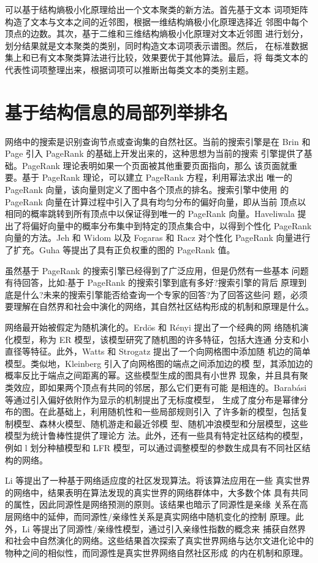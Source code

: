 \documentclass[a4paper]{apa6}
\begin{document}
可以基于结构熵极小化原理给出一个文本聚类的新方法。首先基于文本 词项矩阵构造了文本与文本之间的近邻图，根据一维结构熵极小化原理选择近 邻图中每个顶点的边数。其次，基于二维和三维结构熵极小化原理对文本近邻图 进行划分，划分结果就是文本聚类的类别，同时构造文本词项表示谱图。然后， 在标准数据集上和已有文本聚类算法进行比较，效果要优于其他算法。最后，将 每类文本的代表性词项整理出来，根据词项可以推断出每类文本的类别主题。

\section{基于结构信息的局部列举排名}
\label{sec:org2845766}
网络中的搜索是识别查询节点或查询集的自然社区。当前的搜索引擎是在 Brin 和 Page 引入 PageRank 的基础上开发出来的，这种思想为当前的搜索 引擎提供了基础。PageRank 理论表明如果一个页面被其他重要页面指向，那么 该页面就重要。基于 PageRank 理论，可以建立 PageRank 方程，利用幂法求出 唯一的 PageRank 向量，该向量则定义了图中各个顶点的排名。搜索引擎中使用 的 PageRank 向量在计算过程中引入了具有均匀分布的偏好向量，即从当前 顶点以相同的概率跳转到所有顶点中以保证得到唯一的 PageRank 向量。Haveliwala 提出了将偏好向量中的概率分布集中到特定的顶点集合中，以得到个性化 PageRank 向量的方法。Jeh 和 Widom 以及 Fogaras 和 Racz 对个性化 PageRank 向量进行了扩充。Guha 等\citep{guha2004propagation}提出了具有正负权重的图的 PageRank 值。

虽然基于 PageRank 的搜索引擎已经得到了广泛应用，但是仍然有一些基本 问题有待回答，比如:基于 PageRank 的搜索引擎到底有多好?搜索引擎的背后 原理到底是什么?未来的搜索引擎能否给查询一个专家的回答?为了回答这些问 题，必须要理解在自然界和社会中演化的网络，其自然社区结构形成的机制和原理是什么。

网络最开始被假定为随机演化的。Erdös 和 Rényi 提出了一个经典的网 络随机演化模型，称为 ER 模型，该模型研究了随机图的许多特征，包括大连通 分支和小直径等特征。此外，Watts 和 Strogatz 提出了一个向网格图中添加随 机边的简单模型。类似地，Kleinberg 引入了向网格图的端点之间添加边的模 型，其添加边的概率反比于端点之间距离的幂。这些模型生成的图具有小世界 现象，并且具有聚类效应，即如果两个顶点有共同的邻居，那么它们更有可能 是相连的。Barabási 等通过引入偏好依附作为显示的机制提出了无标度模型， 生成了度分布是幂律分布的图。在此基础上，利用随机性和一些局部规则引入 了许多新的模型，包括复制模型、森林火模型、随机游走和最近邻模 型、随机冲浪模型和分层模型，这些模型为统计鲁棒性提供了理论方 法。此外，还有一些具有特定社区结构的模型，例如 l 划分种植模型和 LFR 模型，可以通过调整模型的参数生成具有不同社区结构的网络。

Li 等\citep{li2015discovering}提出了一种基于网络适应度的社区发现算法。将该算法应用在一些 真实世界的网络中，结果表明在算法发现的真实世界的网络群体中，大多数个体 具有共同的属性，因此同源性是网络预测的原则。该结果也暗示了同源性是亲缘 关系在高层网络中的延伸，而同源性/亲缘性关系是真实网络中随机变化的控制 原理。此外，Li 等\citep{li2015discovering}提出了同源性/亲缘性模型，通过引入亲缘性指数的概念来 捕获自然界和社会中自然演化的网络。这些结果首次探索了真实世界网络与达尔文进化论中的物种之间的相似性，而同源性是真实世界网络自然社区形成 的内在机制和原理。
\end{document}
